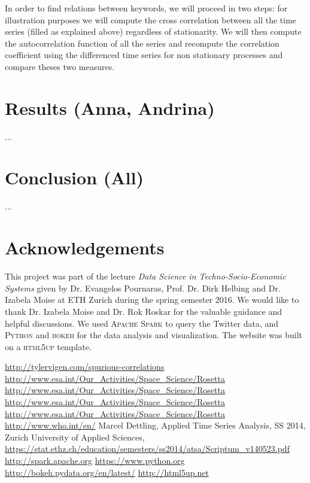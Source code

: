 \documentclass[12pt, a4paper]{article}
\begin{document}
In order to find relations between keywords, we will proceed in two steps: for illustration purposes we will compute the cross correlation between all the time series (filled as explained above) regardless of stationarity. We will then compute the autocorrelation function of all the series and recompute the correlation coefficient using the differenced time series for non stationary processes and compare theses two measures. 

\section{Results (Anna, Andrina)}
...


\section{Conclusion (All)}
...


\section{Acknowledgements}
This project was part of the lecture \textit{Data Science in Techno-Socio-Economic Systems} given by Dr. Evangelos Pournaras, Prof. Dr. Dirk Helbing and Dr. Izabela Moise at ETH Zurich during the spring semester 2016. We would like to thank Dr. Izabela Moise and Dr. Rok Roskar for the valuable guidance and helpful discussions. We used \textsc{Apache Spark} \cite{spark}  to query the Twitter data, and \textsc{Python} \cite{python} and \textsc{bokeh} \cite{bokeh} for the data analysis and visualization. The website was built on a \textsc{html5up} \cite{html5up} template.

\begin{thebibliography}{9}

\url{http://tylervigen.com/spurious-correlations}
\url{http://www.esa.int/Our_Activities/Space_Science/Rosetta}
\url{http://www.esa.int/Our_Activities/Space_Science/Rosetta}
\url{http://www.esa.int/Our_Activities/Space_Science/Rosetta}
\url{http://www.esa.int/Our_Activities/Space_Science/Rosetta}
\url{http://www.who.int/en/}
 Marcel Dettling, Applied Time Series Analysis, SS 2014, Zurich University of Applied Sciences, \url{https://stat.ethz.ch/education/semesters/ss2014/atsa/Scriptum_v140523.pdf}
\url{http://spark.apache.org}
\url{https://www.python.org}
\url{http://bokeh.pydata.org/en/latest/}
\url{http://html5up.net}

\end{thebibliography}
\end{document}
